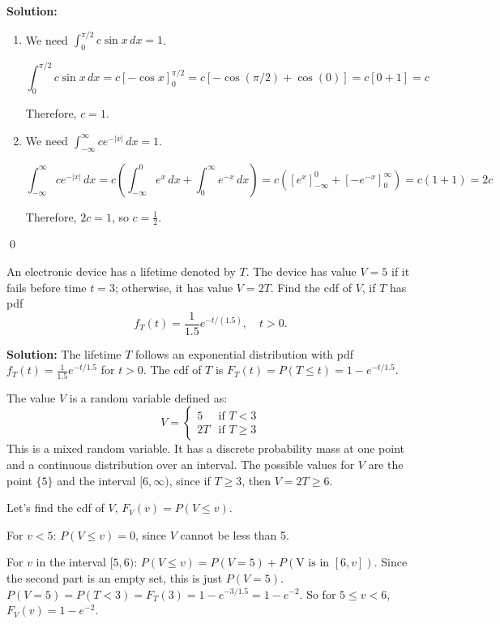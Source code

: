 \noindent\textbf{Solution:}
\begin{enumerate}[label=(\alph*)]
    \item We need $\int_{0}^{\pi/2} c \sin x \, dx = 1$.
    
    \[ \int_{0}^{\pi/2} c \sin x \, dx = c[-\cos x]_{0}^{\pi/2} = c[-\cos(\pi/2) + \cos(0)] = c[0 + 1] = c \]
    
    Therefore, $c = 1$.
    
    \item We need $\int_{-\infty}^{\infty} ce^{-|x|} \, dx = 1$.
    
    \[ \int_{-\infty}^{\infty} ce^{-|x|} \, dx = c \left( \int_{-\infty}^{0} e^{x} \, dx + \int_{0}^{\infty} e^{-x} \, dx \right) = c([e^{x}]_{-\infty}^{0} + [-e^{-x}]_{0}^{\infty}) = c(1 + 1) = 2c \]
    
    Therefore, $2c = 1$, so $c = \frac{1}{2}$.
\end{enumerate}



\qed
\begin{problembox}
An electronic device has a lifetime denoted by $T$. The device has value $V = 5$ if it fails before time $t = 3$; otherwise, it has value $V = 2T$. Find the cdf of $V$, if $T$ has pdf
\[ f_T(t) = \frac{1}{1.5} e^{-t/(1.5)}, \quad t > 0. \]
\end{problembox}

\noindent\textbf{Solution:}
The lifetime $T$ follows an exponential distribution with pdf $f_T(t) = \frac{1}{1.5}e^{-t/1.5}$ for $t>0$. The cdf of $T$ is $F_T(t) = P(T \le t) = 1 - e^{-t/1.5}$.

The value $V$ is a random variable defined as:
\[ V = \begin{cases} 5 & \text{if } T < 3 \\ 2T & \text{if } T \ge 3 \end{cases} \]
This is a mixed random variable. It has a discrete probability mass at one point and a continuous distribution over an interval.
The possible values for $V$ are the point $\{5\}$ and the interval $[6, \infty)$, since if $T \ge 3$, then $V = 2T \ge 6$.

Let's find the cdf of $V$, $F_V(v) = P(V \le v)$.

For $v < 5$:
$P(V \le v) = 0$, since $V$ cannot be less than 5.

For $v$ in the interval $[5, 6)$:
$P(V \le v) = P(V=5) + P(\text{V is in } [6, v])$. Since the second part is an empty set, this is just $P(V=5)$.
$P(V=5) = P(T < 3) = F_T(3) = 1 - e^{-3/1.5} = 1 - e^{-2}$.
So for $5 \le v < 6$, $F_V(v) = 1 - e^{-2}$.

